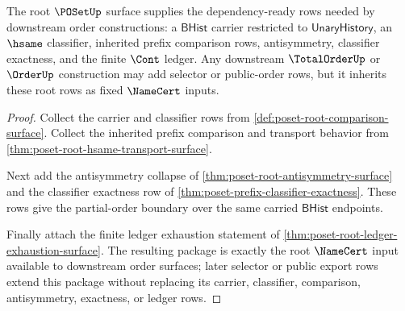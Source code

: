 \begin{theorem}\label{thm:poset-root-threshold-unblock-surface}
The root $\POSetUp$ surface supplies the dependency-ready rows needed by
downstream order constructions: a $\mathsf{BHist}$ carrier restricted to
$\mathsf{UnaryHistory}$, an $\hsame$ classifier, inherited prefix comparison
rows, antisymmetry, classifier exactness, and the finite $\Cont$ ledger. Any
downstream $\TotalOrderUp$ or $\OrderUp$ construction may add selector or
public-order rows, but it inherits these root rows as fixed $\NameCert$
inputs.
\end{theorem}
\begin{proof}
Collect the carrier and classifier rows from
\autoref{def:poset-root-comparison-surface}. Collect the inherited prefix
comparison and transport behavior from
\autoref{thm:poset-root-hsame-transport-surface}.

Next add the antisymmetry collapse of
\autoref{thm:poset-root-antisymmetry-surface} and the classifier exactness
row of \autoref{thm:poset-prefix-classifier-exactness}. These rows give the
partial-order boundary over the same carried $\mathsf{BHist}$ endpoints.

Finally attach the finite ledger exhaustion statement of
\autoref{thm:poset-root-ledger-exhaustion-surface}. The resulting package is
exactly the root $\NameCert$ input available to downstream order surfaces;
later selector or public export rows extend this package without replacing
its carrier, classifier, comparison, antisymmetry, exactness, or ledger rows.
\end{proof}

